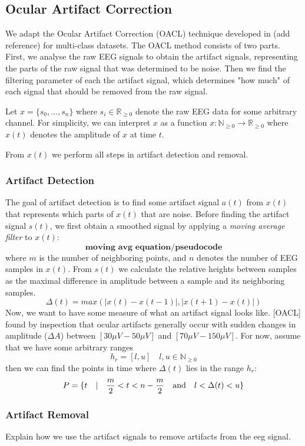 \subsection{Ocular Artifact Correction}
We adapt the  Ocular Artifact Correction (OACL) technique developed in (add reference) for multi-class datasets. The OACL method consists of two parts. First, we analyse the raw EEG signals to obtain the artifact signals, representing the parts of the raw signal that was determined to be noise. Then we find the filtering parameter of each the artifact signal, which determines "how much" of each signal that should be removed from the raw signal. 

Let $x = \{s_0, ...,s_n\}$ where $s_i \in \mathbb{R}_{\geq 0}$ denote the raw EEG data for some arbitrary channel. For simplicity, we can interpret $x$ as a function $x : \mathbb{N}_{\geq 0} \rightarrow \mathbb{R}_{\geq 0}$ where $x(t)$ denotes the amplitude of $x$ at time $t$. 

From $x(t)$ we perform all steps in artifact detection and removal.


\subsubsection{Artifact Detection}
The goal of artifact detection is to find some artifact signal $a(t)$ from $x(t)$ that represents which parts of $x(t)$ that are noise. Before finding the artifact signal $s(t)$, we first obtain a smoothed signal by applying a \emph{moving average filter} to $x(t)$:
\begin{equation}
\label{eq:movavg}
\textbf{moving avg equation/pseudocode}
\end{equation}
where $m$ is the number of neighboring points, and $n$ denotes the number of EEG samples in $x(t)$. From $s(t)$ we calculate the relative heights between samples as the maximal difference in amplitude between a sample and its neighboring samples.
\begin{equation}
\label{eq:relheights}
\Delta (t) = max(|x(t)-x(t-1)|,|x(t+1) - x(t)|)
\end{equation}
Now, we want to have some measure of what an artifact signal looks like. [OACL] found by inspection that ocular artifacts generally occur with sudden changes in amplitude ($\Delta A$) between $[30\mu V-50\mu V]$ and $[70\mu V-150\mu V]$. For now, assume that we have some arbitrary ranges
\begin{equation}
\label{eq:ranges}
h_r=[l, u] \quad  l,u \in \mathbb{N}_{\geq 0}
\end{equation}
then we can find the points in time where $\Delta (t)$  lies in the range $h_r$:
\begin{equation}
\label{eq:peaks}
P = \{t \quad | \quad \frac{m}{2} < t < n-\frac{m}{2} \quad \textnormal{and} \quad l < \Delta (t) < u\}
\end{equation}
\subsubsection{Artifact Removal}
Explain how we use the artifact signals to remove artifacts from the eeg signal.
